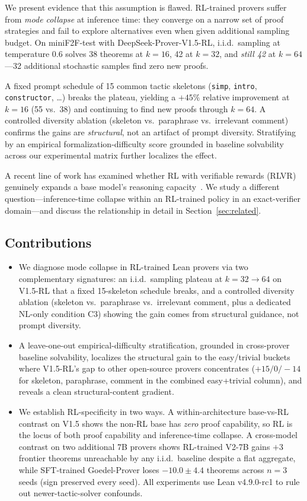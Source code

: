 \documentclass{article}
\begin{document}
We present evidence that this assumption is flawed. RL-trained provers suffer from \emph{mode collapse} at inference time: they converge on a narrow set of proof strategies and fail to explore alternatives even when given additional sampling budget. On miniF2F-test with DeepSeek-Prover-V1.5-RL, i.i.d.\ sampling at temperature 0.6 solves 38 theorems at $k{=}16$, 42 at $k{=}32$, and \emph{still 42} at $k{=}64$---32 additional stochastic samples find zero new proofs.

A fixed prompt schedule of 15 common tactic skeletons (\texttt{simp}, \texttt{intro}, \texttt{constructor}, \dots) breaks the plateau, yielding a $+45\%$ relative improvement at $k{=}16$ (55 vs.\ 38) and continuing to find new proofs through $k{=}64$. A controlled diversity ablation (skeleton vs.\ paraphrase vs.\ irrelevant comment) confirms the gains are \emph{structural}, not an artifact of prompt diversity. Stratifying by an empirical formalization-difficulty score grounded in baseline solvability across our experimental matrix further localizes the effect.

A recent line of work has examined whether RL with verifiable rewards (RLVR) genuinely expands a base model's reasoning capacity~\cite{yue2025rlvr, wu2025invisibleleash}. We study a different question---inference-time collapse within an RL-trained policy in an exact-verifier domain---and discuss the relationship in detail in Section~\ref{sec:related}.

\subsection{Contributions}
\begin{itemize}
    \item We diagnose mode collapse in RL-trained Lean provers via two complementary signatures: an i.i.d.\ sampling plateau at $k{=}32\to64$ on V1.5-RL that a fixed 15-skeleton schedule breaks, and a controlled diversity ablation (skeleton vs.\ paraphrase vs.\ irrelevant comment, plus a dedicated NL-only condition C3) showing the gain comes from structural guidance, not prompt diversity.
    \item A leave-one-out empirical-difficulty stratification, grounded in cross-prover baseline solvability, localizes the structural gain to the easy/trivial buckets where V1.5-RL's gap to other open-source provers concentrates ($+15 / 0 / -14$ for skeleton, paraphrase, comment in the combined easy+trivial column), and reveals a clean structural-content gradient.
    \item We establish RL-specificity in two ways. A within-architecture base-vs-RL contrast on V1.5 shows the non-RL base has \emph{zero} proof capability, so RL is the locus of both proof capability and inference-time collapse. A cross-model contrast on two additional 7B provers shows RL-trained V2-7B gains $+3$ frontier theorems unreachable by any i.i.d.\ baseline despite a flat aggregate, while SFT-trained Goedel-Prover loses $-10.0 \pm 4.4$ theorems across $n{=}3$ seeds (sign preserved every seed). All experiments use Lean v4.9.0-rc1 to rule out newer-tactic-solver confounds.
\end{itemize}
\end{document}
